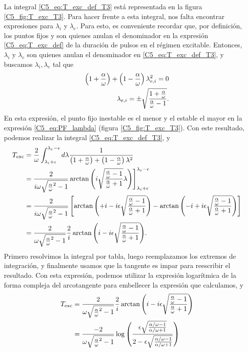 \documentclass[./main.tex]{subfiles}
\begin{document}
La integral \ref{C5_eq:T_exc_def_T3} está representada en la figura \ref{C5_fig:T_exc_T3}. Para hacer frente a esta integral, nos falta encontrar expresiones para $\lambda_i$ y $\lambda_e$. Para esto, es conveniente recordar que, por definición, los puntos fijos \xxi y \xxe son quienes anulan el denominador en la expresión \ref{C5_eq:T_exc_def} de la duración de pulsos en el régimen excitable. Entonces, $\lambda_i$ y $\lambda_e$ son quienes anulan el denominador en \ref{C5_eq:T_exc_def_T3}, y buscamos $\lambda_i,\lambda_e$ tal que 
\begin{align}
    \left(1+\frac{\alpha}{\omega} \right) + \left(1-\frac{\alpha}{\omega} \right) \lambda_{e,i}^2 = 0 \nonumber\\
    \lambda_{e,i} = \pm \sqrt{\frac{1+\frac{\alpha}{\omega}}{\frac{\alpha}{\omega}-1}}. \label{C5_eq:PF_lambda}
\end{align}
En esta expresión, el punto fijo inestable es el menor y el estable el mayor en la expresión \ref{C5_eq:PF_lambda} (figura \ref{C5_fig:T_exc_T3}). Con este resultado, podemos realizar la integral \ref{C5_eq:T_exc_def_T3}, y
\begin{align}
    T_{\text{exc}} &= \frac{2}{\omega}\int_{\lambda_i + \epsilon}^{\lambda_e - \epsilon} d\lambda \frac{1}{\left(1+\ddelta\right) + \left(1-\ddelta\right) \lambda^2} \nonumber\\
    &= \frac{2}{i\omega \sqrt{\ddelta^2 - 1}} \arctan{\left(i\sqrt{\frac{\ddelta - 1}{\ddelta + 1} } \lambda\right)} \Bigg]_{\lambda_i + \epsilon}^{\lambda_e - \epsilon} \nonumber\\
    &= \frac{2}{i \omega \sqrt{\ddelta^2 - 1}}  \left[ \arctan{\left( +i - i \epsilon \sqrt{\frac{\ddelta - 1}{\ddelta + 1}}\right)}  - \arctan{\left( -i +i \epsilon \sqrt{\frac{\ddelta - 1}{\ddelta + 1}}\right)} \right] \nonumber\\
    &= \frac{2}{\omega \sqrt{\ddelta^2 - 1}}  \frac{2}{i} \arctan{\left( i - i \epsilon \sqrt{\frac{\ddelta - 1}{\ddelta + 1}}\right)}.
\end{align}
Primero resolvimos la integral por tabla, luego reemplazamos los extremos de integración, y finalmente usamos que la tangente es impar para reescribir el resultado. Con esta expresión, podemos utilizar la expresión logarítmica de la forma compleja del arcotangente para embellecer la expresión que calculamos, y 
\begin{align}
    T_{\text{exc}} &= \frac{2}{\omega \sqrt{\ddelta^2 - 1}}  \frac{2}{i} \arctan{\left( i - i \epsilon \sqrt{\frac{\ddelta - 1}{\ddelta + 1}}\right)} \nonumber\\
    &= \frac{-2}{ \omega \sqrt{\ddelta^2 - 1}}  \log{\left( \frac{\epsilon \sqrt{\frac{\dddelta - 1}{\dddelta + 1}}}{2-\epsilon \sqrt{\frac{\dddelta - 1}{\dddelta + 1}}}\right)} \nonumber
\end{align}
\end{document}
